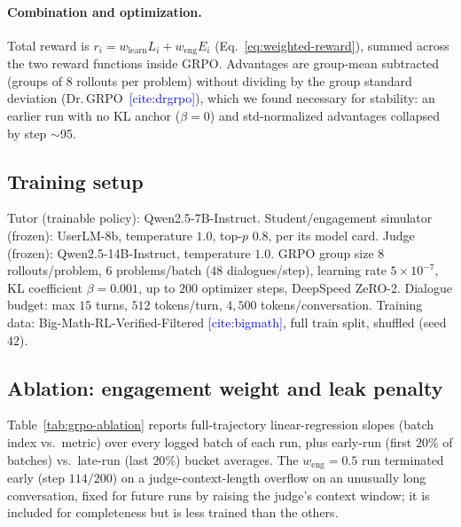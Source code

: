 \documentclass[11pt]{article}
\newcommand{\cit}[1]{\textcolor{blue}{[\textsf{cite:#1}]}}
\begin{document}
\paragraph{Combination and optimization.} Total reward is
$r_i = w_{\text{learn}} L_i + w_{\text{eng}} E_i$ (Eq.~\ref{eq:weighted-reward}), summed
across the two reward functions inside GRPO. Advantages are group-mean
subtracted (groups of $8$ rollouts per problem) without dividing by the group
standard deviation (Dr.\,GRPO~\cit{drgrpo}), which we found necessary for
stability: an earlier run with no KL anchor ($\beta{=}0$) and std-normalized
advantages collapsed by step $\sim$95.

\subsection{Training setup}
\label{app:grpo-training-setup}

Tutor (trainable policy): Qwen2.5-7B-Instruct. Student/engagement simulator
(frozen): UserLM-8b, temperature $1.0$, top-$p$ $0.8$, per its model card.
Judge (frozen): Qwen2.5-14B-Instruct, temperature $1.0$. GRPO group size $8$
rollouts/problem, $6$ problems/batch ($48$ dialogues/step), learning rate
$5\!\times\!10^{-7}$, KL coefficient $\beta=0.001$, up to $200$ optimizer
steps, DeepSpeed ZeRO-2. Dialogue budget: max $15$ turns, $512$ tokens/turn,
$4{,}500$ tokens/conversation. Training data: Big-Math-RL-Verified-Filtered
\cit{bigmath}, full train split, shuffled (seed $42$).

\subsection{Ablation: engagement weight and leak penalty}
\label{app:grpo-ablation-table}

Table~\ref{tab:grpo-ablation} reports full-trajectory linear-regression
slopes (batch index vs.\ metric) over every logged batch of each run, plus
early-run (first $20\%$ of batches) vs.\ late-run (last $20\%$) bucket
averages. The $w_{\text{eng}}{=}0.5$ run terminated early (step $114/200$) on
a judge-context-length overflow on an unusually long conversation, fixed for
future runs by raising the judge's context window; it is included for
completeness but is less trained than the others.
\end{document}
